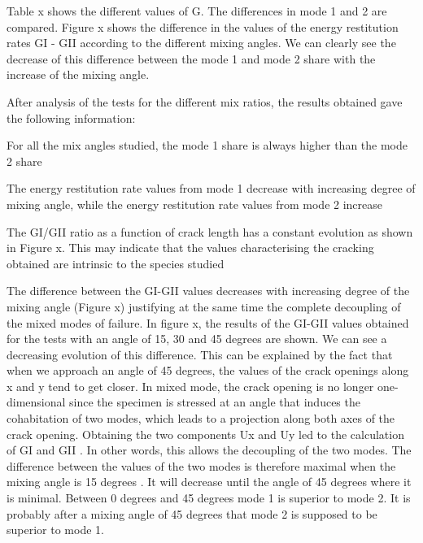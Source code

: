 Table x shows the different values of G. The differences in mode 1 and 2 are compared.
Figure x shows the difference in the values of the energy restitution rates GI - GII according to the different mixing angles. We can clearly see the decrease of this difference between the mode 1 and mode 2 share with the increase of the mixing angle.

After analysis of the tests for the different mix ratios, the results obtained gave the following information:

For all the mix angles studied, the mode 1 share is always higher than the mode 2 share

The energy restitution rate values from mode 1 decrease with increasing degree of mixing angle, while the energy restitution rate values from mode 2 increase

The GI/GII ratio as a function of crack length has a constant evolution as shown in Figure x. This may indicate that the values characterising the cracking obtained are intrinsic to the species studied

The difference between the GI-GII values decreases with increasing degree of the mixing angle (Figure x) justifying at the same time the complete decoupling of the mixed modes of failure. In figure x, the results of the GI-GII values obtained for the tests with an angle of 15, 30 and 45 degrees are shown. We can see a decreasing evolution of this difference. This can be explained by the fact that when we approach an angle of 45 degrees, the values of the crack openings along x and y tend to get closer. In mixed mode, the crack opening is no longer one-dimensional since the specimen is stressed at an angle that induces the cohabitation of two modes, which leads to a projection along both axes of the crack opening. Obtaining the two components Ux and Uy led to the calculation of GI and GII . In other words, this allows the decoupling of the two modes. The difference between the values of the two modes is therefore maximal when the mixing angle is 15 degrees . It will decrease until the angle of 45 degrees where it is minimal. Between 0 degrees and 45 degrees mode 1 is superior to mode 2. It is probably after a mixing angle of 45 degrees that mode 2 is supposed to be superior to mode 1.